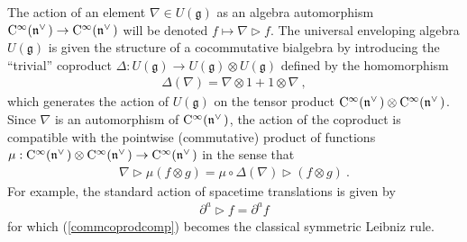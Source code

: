 \documentclass[11pt,a4paper]{article}
\newcommand{\1}{\mathbb{1}}
\def\CC{{\rm C}}
\def\mfn{{\mathfrak n}}
\def\mfg{{\mathfrak g}}
\newcommand{\beq}{\begin{eqnarray}}
\newcommand{\eeq}{\end{eqnarray}}
\begin{document}
The action of an element $\nabla\in U(\mfg)$ as an algebra
automorphism $\CC^\infty(\mfn^{\vee\,})\to\CC^\infty(\mfn^{\vee\,})$ will be
denoted
$f\mapsto\nabla\triangleright f$. The universal enveloping algebra
$U(\mfg)$ is given the structure of a cocommutative bialgebra by
introducing the ``trivial'' coproduct $\Delta:U(\mfg)\to
U(\mfg)\otimes U(\mfg)$ defined by the homomorphism
\beq
\Delta(\nabla)=\nabla\otimes1+1\otimes\nabla \ ,
\label{trivialcoprod}\eeq
which generates the action of $U(\mfg)$ on the tensor product
$\CC^\infty(\mfn^{\vee\,})\otimes\CC^\infty(\mfn^{\vee\,})$. Since $\nabla$ is
an
automorphism of $\CC^\infty(\mfn^{\vee\,})$, the  action of the coproduct is
compatible with the pointwise (commutative) product of functions
$\mu:\CC^\infty(\mfn^{\vee\,})\otimes\CC^\infty(\mfn^{\vee\,})\to
\CC^\infty(\mfn^{\vee\,})$ in the sense that
\beq
\nabla\triangleright\mu(f\otimes g)=\mu\circ\Delta(\nabla)
\triangleright(f\otimes g) \ .
\label{commcoprodcomp}\eeq
For example, the standard action of spacetime translations is given by
\beq
\partial^a\triangleright f=\partial^af
\label{commtranslaction}\eeq
for which (\ref{commcoprodcomp}) becomes the classical symmetric
Leibniz rule.
\end{document}
